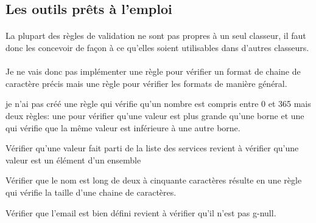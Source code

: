 \subsection{Les outils prêts à l'emploi}
\label{subsec:ready-tools}

\paragraph{}
La plupart des règles de validation ne sont pas propres à un seul classeur, il faut donc les concevoir de façon à ce qu'elles soient utilisables dans d'autres classeurs.

\paragraph{}
Je ne vais donc pas implémenter une règle pour vérifier un format de chaine de caractère précis mais une règle pour vérifier les formats de manière général.

je n'ai pas créé une règle qui vérifie qu'un nombre est compris entre 0 et 365 mais deux règles: une pour vérifier qu'une valeur est plus grande qu'une borne et une qui vérifie que la même valeur est inférieure à une autre borne.

Vérifier qu'une valeur fait parti de la liste des services revient à vérifier qu'une valeur est un élément d'un ensemble

Vérifier que le nom est long de deux à cinquante caractères résulte en une règle qui vérifie la taille d'une chaine de caractères.

Vérifier que l'email est bien défini revient à vérifier qu'il n'est pas \gls{g-null}.
